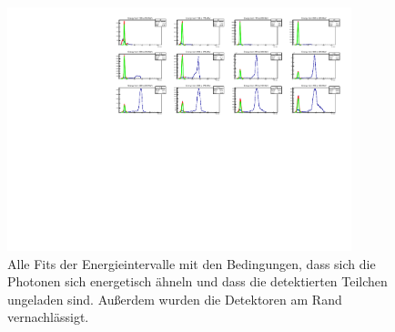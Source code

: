 \documentclass[a4paper,11pt,oneside,final,german,openbib,pdftex]{scrbook}
\begin{document}
{\begin{appendix}
\begin{figure}[h!]
	\begin{center}
		\includegraphics[width=100mm]{30DegreeCutRealDataAllFits}
		\caption{Alle Fits der Energieintervalle mit den Bedingungen, dass sich die Photonen sich energetisch ähneln und dass die detektierten Teilchen ungeladen sind. Au{\ss}erdem wurden die Detektoren am Rand vernachl\"assigt.}
		\label{fig:30-Degree-Cut-RealData-All-Fits}
	\end{center}
\end{figure}



\end{appendix}}
\end{document}
